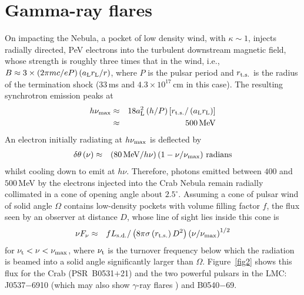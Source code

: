 \documentclass{PoS}
\begin{document}
\section{Gamma-ray flares}
On impacting the Nebula, a pocket of low density wind, with $\kappa\sim1$, 
injects radially directed, 
PeV electrons into the turbulent downstream magnetic field, whose strength
is roughly three times that in the wind, i.e., 
$B\approx3\times\left(2\pi m c/e P\right)\left(a_{\rm L}r_{\rm L}/r\right)$, where
$P$ is the pulsar period and $r_{\rm t.s.}$ is the radius
of the termination shock ($33\,$ms and $4.3\times10^{17}\,\textrm{cm}$
in this case). The resulting synchrotron emission peaks at 
\begin{eqnarray}
h\nu_{\rm max}&\approx&18 a_{\rm L}^2 \left(h/P\right)
\left[r_{\rm t.s.}/\left(a_{\rm L}r_{\rm L}\right)\right]
\nonumber\\
&\approx&500\,\textrm{MeV}
\label{numaxeq}
\end{eqnarray}
An electron initially radiating at $h\nu_{\rm max}$ is 
deflected by 
\begin{eqnarray}
\delta\theta\left(\nu\right)&\approx&\left(80\,\textrm{MeV}/h\nu\right)
\left(1-\nu/\nu_{\rm max}\right)\,\textrm{radians}
\label{divergence}
\end{eqnarray}
whilst cooling down to emit at $h\nu$.
Therefore, photons emitted between $400$ and $500\,$MeV by the electrons
injected into the Crab Nebula remain radially collimated in a cone
of opening angle about $2.5^\circ$. Assuming a cone of pulsar wind of solid
angle $\Omega$ contains low-density pockets with volume
filling factor $f$, the flux seen by an observer at distance $D$, 
whose line of sight lies inside this cone is
\begin{eqnarray}
\nu F_\nu&\approx&
f L_{\rm s.d.}/\left(8\pi\sigma\left(r_{\rm t.s.}\right) D^2\right)
\left(\nu/\nu_{\rm max}\right)^{1/2}
\label{predictedspectrum}
\end{eqnarray}
for $\nu_{\rm t}<\nu<\nu_{\rm max}$, where $\nu_{\rm t}$ is the turnover frequency
below which the radiation is beamed into a solid angle significantly larger than
$\Omega$. Figure~\ref{fig2} shows this flux for the Crab (PSR~B0531$+$21)
and the two powerful pulsars in the LMC: J0537$-$6910 (which may also 
show $\gamma$-ray flares \cite{saitoetal17}) and B0540$-$69.
\end{document}
